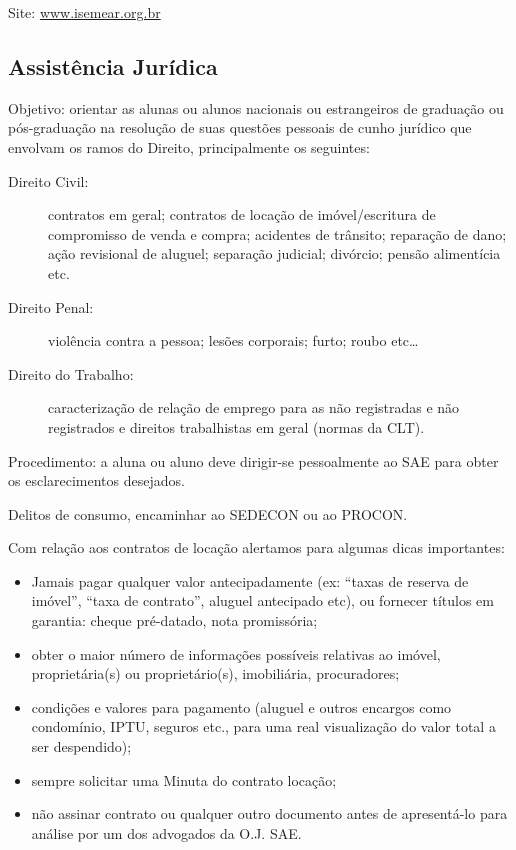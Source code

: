 Site: \url{www.isemear.org.br}

\subsection{Assistência Jurídica}

Objetivo: orientar as alunas ou alunos nacionais ou estrangeiros de graduação
ou pós-graduação na resolução de suas questões pessoais de cunho jurídico que
envolvam os ramos do Direito, principalmente os seguintes:

\begin{description}
\item[Direito Civil:] contratos em geral; contratos de locação de
  imóvel/escritura de compromisso de venda e compra; acidentes de trânsito;
  reparação de dano; ação revisional de aluguel; separação judicial; divórcio;
  pensão alimentícia etc.

\item[Direito Penal:] violência contra a pessoa; lesões corporais; furto; roubo
  etc{\dots}

\item[Direito do Trabalho:] caracterização de relação de emprego para as não
  registradas e não registrados e direitos trabalhistas em geral (normas da
  CLT).
\end{description}

Procedimento: a aluna ou aluno deve dirigir-se pessoalmente ao SAE para obter
os esclarecimentos desejados.

Delitos de consumo, encaminhar ao SEDECON ou ao PROCON.

Com relação aos contratos de locação alertamos para algumas dicas importantes:

\begin{itemize}
\item Jamais pagar qualquer valor antecipadamente (ex: ``taxas de reserva de
  imóvel'', ``taxa de contrato'', aluguel antecipado etc), ou fornecer títulos
  em garantia: cheque pré-datado, nota promissória;

\item obter o maior número de informações possíveis relativas ao imóvel,
  proprietária(s) ou proprietário(s), imobiliária, procuradores;

\item condições e valores para pagamento (aluguel e outros encargos como
  condomínio, IPTU, seguros etc., para uma real visualização do valor total a
  ser despendido);

\item sempre solicitar uma Minuta do contrato locação;

\item não assinar contrato ou qualquer outro documen\-to antes de apresentá-lo
  para análise por um dos advogados da O.J. SAE.
\end{itemize}

